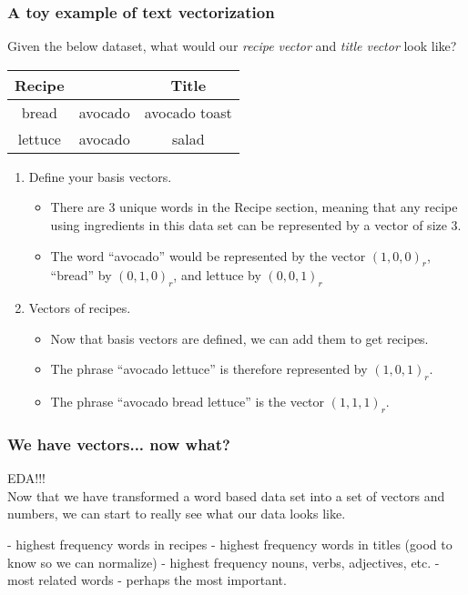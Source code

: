 \documentclass{beamer}
\begin{document}
\begin{frame}
	\frametitle{A toy example of text vectorization}
	Given the below dataset, what would our \textit{recipe vector} and \textit{title vector} look like?
	\begin{center}
		\begin{tabular}{ |c c | c|}
			\hline
			Recipe & & Title \\
			\hline\hline
			bread & avocado & avocado toast \\
			\hline
			lettuce & avocado & salad \\		
			\hline
		\end{tabular}
	\end{center}

	\begin{enumerate}
	
		\item Define your basis vectors.
		\begin{itemize}
			\item There are 3 unique words in the Recipe section,
				meaning that any recipe using ingredients in
				this data set can be represented by a vector of
				size 3.
			\item The word ``avocado'' would be represented by the vector $(1,0,0)_r$, 
				``bread'' by $(0,1,0)_r$, and lettuce by $(0,0,1)_r$
		\end{itemize}
		\item Vectors of recipes.
		\begin{itemize}
			\item Now that basis vectors are defined, we can add them to get recipes.
			\item The phrase ``avocado lettuce'' is therefore represented by $(1,0,1)_r$.
			\item The phrase ``avocado bread lettuce'' is the vector $(1,1,1)_r$.
		\end{itemize}

	\end{enumerate}
\end{frame}

\begin{frame}
	\frametitle{We have vectors... now what?}
		EDA!!!\\
		\medskip
		Now that we have transformed a word based data set into a set
		of vectors and numbers, we can start to really see what our
		data looks like.

		- highest frequency words in recipes
		- highest frequency words in titles (good to know so we can normalize)
		- highest frequency nouns, verbs, adjectives, etc.
		- most related words - perhaps the most important.

\end{frame}
	
\end{document}
